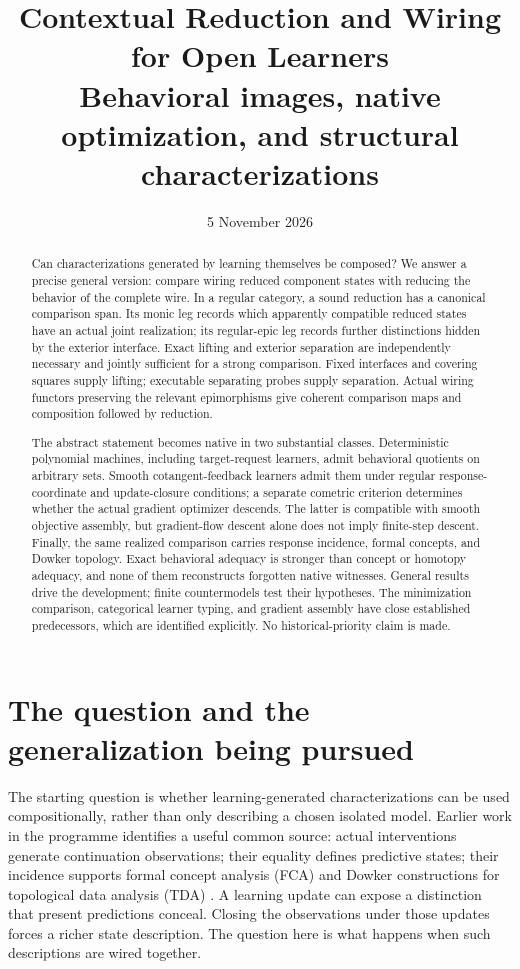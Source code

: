 \documentclass[11pt]{article}
\title{Contextual Reduction and Wiring for Open Learners\\
\large Behavioral images, native optimization, and structural characterizations}
\author{}\date{5 November 2026}
\theoremstyle{definition}
\theoremstyle{remark}\newtheorem{remark}[theorem]{Remark}
\begin{document}
\maketitle
\begin{abstract}
Can characterizations generated by learning themselves be composed?
We answer a precise general version: compare wiring reduced component states
with reducing the behavior of the complete wire. In a regular category,
a sound reduction has a canonical comparison span. Its monic leg records
which apparently compatible reduced states have an actual joint realization;
its regular-epic leg records further distinctions hidden by the exterior
interface. Exact lifting and exterior separation are independently necessary
and jointly sufficient for a strong comparison. Fixed interfaces and
covering squares supply lifting; executable separating probes supply
separation. Actual wiring functors preserving the relevant epimorphisms
give coherent comparison maps and composition followed by reduction.

The abstract statement becomes native in two substantial classes.
Deterministic polynomial machines, including target-request learners, admit
behavioral quotients on arbitrary sets. Smooth cotangent-feedback learners
admit them under regular response-coordinate and update-closure conditions;
a separate cometric criterion determines whether the actual gradient
optimizer descends. The latter is compatible with smooth objective assembly,
but gradient-flow descent alone does not imply finite-step descent.
Finally, the same realized comparison carries response incidence, formal
concepts, and Dowker topology. Exact behavioral adequacy is stronger than
concept or homotopy adequacy, and none of them reconstructs forgotten native
witnesses. General results drive the development; finite countermodels test
their hypotheses. The minimization comparison, categorical learner typing,
and gradient assembly have close established predecessors, which are
identified explicitly. No historical-priority claim is made.
\end{abstract}

\section{The question and the generalization being pursued}
The starting question is whether learning-generated characterizations can
be used compositionally, rather than only describing a chosen isolated
model. Earlier work in the programme identifies a useful common source:
actual interventions generate continuation observations; their equality
defines predictive states; their incidence supports formal concept analysis
(FCA) and Dowker constructions for topological data analysis (TDA)
\cite{CommonNote,LearningNote}. A learning update can expose a distinction
that present predictions conceal. Closing the observations under those
updates forces a richer state description. The question here is what happens
when such descriptions are wired together.
\end{document}
